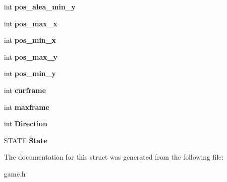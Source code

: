 \begin{DoxyCompactItemize}
\item 
\mbox{\label{structent_aef1b031dc8b230ae3a0758026a6d38ac}} 
int {\bfseries pos\+\_\+alea\+\_\+min\+\_\+y}
\item 
\mbox{\label{structent_a5b94401696ef3efa501b6c385002c9ec}} 
int {\bfseries pos\+\_\+max\+\_\+x}
\item 
\mbox{\label{structent_a09b9e9e59a320783defabfc9b2b13472}} 
int {\bfseries pos\+\_\+min\+\_\+x}
\item 
\mbox{\label{structent_a7484c8e1151a8213da135da607777b70}} 
int {\bfseries pos\+\_\+max\+\_\+y}
\item 
\mbox{\label{structent_a732ef8e99756713622fb859d06c2ba9d}} 
int {\bfseries pos\+\_\+min\+\_\+y}
\item 
\mbox{\label{structent_a939e5fe13dc8d4682ddbc87ddc8e45ad}} 
int {\bfseries curframe}
\item 
\mbox{\label{structent_a9194acb09e81082e587403df320596ca}} 
int {\bfseries maxframe}
\item 
\mbox{\label{structent_adf590d5e8b601da7bee63b67489e522a}} 
int {\bfseries Direction}
\item 
\mbox{\label{structent_a430bce59586932a67536661d020a1347}} 
S\+T\+A\+TE {\bfseries State}
\end{DoxyCompactItemize}


The documentation for this struct was generated from the following file\+:\begin{DoxyCompactItemize}
\item 
game.\+h\end{DoxyCompactItemize}
